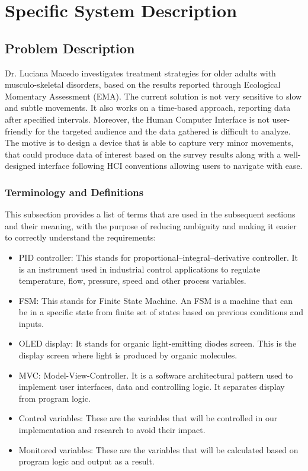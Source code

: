 \documentclass[12pt]{article}
\begin{document}
\section{Specific System Description}
\label{SSD}
\subsection{Problem Description} \label{Sec_pd}

Dr. Luciana Macedo investigates treatment strategies for older adults with musculo-skeletal disorders, based on the results reported through Ecological Momentary Assessment (EMA).
The current solution is not very sensitive to slow and subtle movements. It also works on a time-based approach, reporting data after specified intervals. Moreover, the Human Computer Interface is not user-friendly for the targeted audience and the data gathered is difficult to analyze.
The motive is to design a device that is able to capture very minor movements, that could produce data of interest based on the survey results along with a well-designed interface following HCI conventions allowing users to navigate with ease.

\subsubsection{Terminology and  Definitions}

This subsection provides a list of terms that are used in the subsequent
sections and their meaning, with the purpose of reducing ambiguity and making it
easier to correctly understand the requirements:

\begin{itemize}

  \item PID controller: This stands for proportional–integral–derivative controller. It is an instrument used in industrial control applications to regulate temperature, flow, pressure, speed and other process variables.
  \item FSM: This stands for Finite State Machine. An FSM is a machine that can be in a specific state from finite set of states based on previous conditions and inputs.
  \item OLED display: It stands for organic light-emitting diodes screen. This is the display screen where light is produced by organic molecules.
  \item MVC: Model-View-Controller. It is a software architectural pattern used to implement user interfaces, data and controlling logic. It separates display from program logic.
  \item Control variables: These are the variables that will be controlled in our implementation and research to avoid their impact.
  \item Monitored variables: These are the variables that will be calculated based on program logic and output as a result.

\end{itemize}
\end{document}
